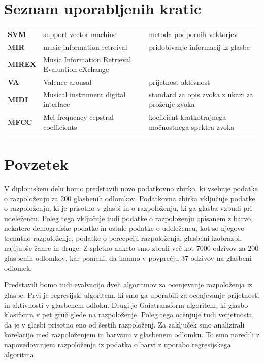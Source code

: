 \documentclass[a4paper, 12pt]{book}
\newcommand{\clearemptydoublepage}{\newpage{\pagestyle{empty}\cleardoublepage}}
\begin{document}
{\chapter*{Seznam uporabljenih kratic}

\begin{tabular}{p{2cm}|p{5.6cm}|p{5.6cm}}
  
  {\bf SVM} & support vector machine & metoda podpornih vektorjev \\
  {\bf MIR} & music information retreival & pridobivanje informacij iz glasbe \\
  {\bf MIREX} & Music Information Retrieval Evaluation eXchange &  \\
  {\bf VA} & Valence-arousal & prijetnost-aktivnost \\
  {\bf MIDI} & Musical instrument digital interface & standard za opis zvoka z ukazi za proženje zvoka \\
  {\bf MFCC} & Mel-frequency cepstral coefficients & koeficient kratkotrajnega močnostnega spektra zvoka \\
  
  
  

\end{tabular}



\clearemptydoublepage

\chapter*{Povzetek}

V diplomskem delu bomo predstavili novo podatkovno zbirko, ki vsebuje podatke o razpoloženju za 200 glasbenih odlomkov. Podatkovna zbirka vključuje podatke o razpoloženju, ki je prisotno v glasbi in o razpoloženju, ki ga glasba vzbudi pri udeležencu. Poleg tega vključuje tudi podatke o razpoloženju opisanem z barvo, nekatere demografske podatke in ostale podatke o udeležencu, kot so njegovo trenutno razpoloženje, podatke o percepciji razpoloženja, glasbeni izobrazbi, najljubše žanre in druge. Z spletno anketo smo zbrali več kot 7000 odzivov za 200 glasbenih odlomkov, kar pomeni, da imamo v povprečju 37 odzivov na glasbeni odlomek. 

Predstavili bomo tudi evalvacijo dveh algoritmov za ocenjevanje razpoloženja iz glasbe. Prvi je regresijski algoritem, ki smo ga uporabili za ocenjevanje prijetnosti in aktivnosti v glasbenem odloku. Drugi je Gaiatransform algoritem, ki glasbo klasificira v pet gruč glede na razpoloženje. Poleg tega ocenjuje tudi verjetnosti, da je v glasbi prisotno eno od šestih razpoloženj. Za zaključek smo analizirali korelacijo med razpoloženjem in barvami v glasbenem odlomku. To smo naredili z napovedovanjem razpoloženja iz podatka o barvi z uporabo regresijskega algoritma.  


}
\end{document}
